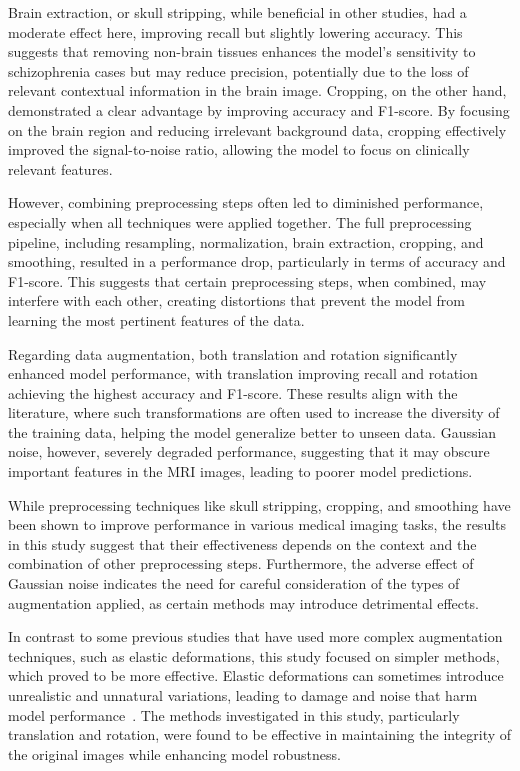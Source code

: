 Brain extraction, or skull stripping, while beneficial in other studies, had a moderate effect here, improving recall but slightly lowering accuracy. This suggests that removing non-brain tissues enhances the model's sensitivity to schizophrenia cases but may reduce precision, potentially due to the loss of relevant contextual information in the brain image. Cropping, on the other hand, demonstrated a clear advantage by improving accuracy and F1-score. By focusing on the brain region and reducing irrelevant background data, cropping effectively improved the signal-to-noise ratio, allowing the model to focus on clinically relevant features.

However, combining preprocessing steps often led to diminished performance, especially when all techniques were applied together. The full preprocessing pipeline, including resampling, normalization, brain extraction, cropping, and smoothing, resulted in a performance drop, particularly in terms of accuracy and F1-score. This suggests that certain preprocessing steps, when combined, may interfere with each other, creating distortions that prevent the model from learning the most pertinent features of the data.

Regarding data augmentation, both translation and rotation significantly enhanced model performance, with translation improving recall and rotation achieving the highest accuracy and F1-score. These results align with the literature, where such transformations are often used to increase the diversity of the training data, helping the model generalize better to unseen data. Gaussian noise, however, severely degraded performance, suggesting that it may obscure important features in the MRI images, leading to poorer model predictions.

While preprocessing techniques like skull stripping, cropping, and smoothing have been shown to improve performance in various medical imaging tasks, the results in this study suggest that their effectiveness depends on the context and the combination of other preprocessing steps. Furthermore, the adverse effect of Gaussian noise indicates the need for careful consideration of the types of augmentation applied, as certain methods may introduce detrimental effects.

In contrast to some previous studies that have used more complex augmentation techniques, such as elastic deformations, this study focused on simpler methods, which proved to be more effective. Elastic deformations can sometimes introduce unrealistic and unnatural variations, leading to damage and noise that harm model performance~\cite{Mok2018}. The methods investigated in this study, particularly translation and rotation, were found to be effective in maintaining the integrity of the original images while enhancing model robustness.

